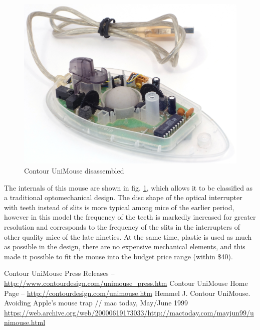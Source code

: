 \documentclass[11pt, a4paper]{article}
\begin{document}
\begin{figure}[h]
    \centering
    \includegraphics[scale=0.7]{1999_contour_unimouse/inside_30.jpg}
    \caption{Contour UniMouse disassembled}
    \label{fig:ContourUniMouseInside}
\end{figure}

The internals of this mouse are shown in fig. \ref{fig:ContourUniMouseInside}, which allows it to be classified as a traditional optomechanical design. The disc shape of the optical interrupter with teeth instead of slits is more typical among mice of the earlier period, however in this model the frequency of the teeth is markedly increased for greater resolution and corresponds to the frequency of the slits in the interrupters of other quality mice of the late nineties. At the same time, plastic is used as much as possible in the design, there are no expensive mechanical elements, and this made it possible to fit the mouse into the budget price range (within \$40).

\begin{thebibliography}{9}
     Contour UniMouse Press Releases -- \url{http://www.contourdesign.com/unimouse_press.htm} 
     Contour UniMouse Home Page -- \url{http://contourdesign.com/unimouse.htm}
     Hemmel J. Contour UniMouse. Avoiding Apple's mouse trap // mac today, May/June 1999 \url{https://web.archive.org/web/20000619173033/http://mactoday.com/mayjun99/unimouse.html}
\end{thebibliography}
\end{document}
